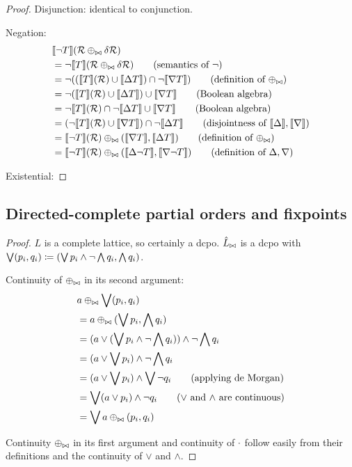 \begin{proof}
  Disjunction: identical to conjunction.
  
  Negation:
  \begin{align*}
    &\sem{\neg T}(\semR \twist \diffR)\\
    &= \neg \sem{T}(\semR \twist \diffR) \tag{semantics of $\neg$}\\
    &= \neg ((\sem{T}(\semR) \cup \upsem{T}) \cap \neg \downsem{T}) \tag{definition of $\twist$}\\
    &= \neg (\sem{T}(\semR) \cup \upsem{T}) \cup \downsem{T} \tag{Boolean algebra}\\
    &= \neg \sem{T}(\semR) \cap \neg \upsem{T} \cup \downsem{T} \tag{Boolean algebra}\\
    &= (\neg \sem{T}(\semR) \cup \downsem{T}) \cap \neg \upsem{T} \tag{disjointness of $\upsem{}, \downsem{}$}\\
    &= \sem{\neg T}(\semR) \twist (\downsem{T}, \upsem{T}) \tag{definition of $\twist$}\\
    &= \sem{\neg T}(\semR) \twist (\upsem{\neg T}, \downsem{\neg T}) \tag{definition of $\updiff{}, \downdiff{}$}
  \end{align*}

  Existential:

\end{proof}

\subsection{Directed-complete partial orders and fixpoints}

\booleanAlgebraContinuous*
\begin{proof}
  \label{prf:booleanAlgebraContinuous}
  $L$ is a complete lattice, so certainly a dcpo. $\hat{L}_{\bowtie}$ is a
  dcpo with $\bigvee (p_i, q_i) \coloneqq (\bigvee p_i \wedge \neg \bigwedge q_i, \bigwedge q_i)$.

  Continuity of $\oplus_{\bowtie}$ in its second argument:
  \begin{align*}
    &a \oplus_{\bowtie} \bigvee (p_i, q_i)\\
    &= a \oplus_{\bowtie} (\bigvee p_i, \bigwedge q_i)\\
    &= (a \vee (\bigvee p_i \wedge \neg \bigwedge q_i)) \wedge \neg \bigwedge q_i\\
    &= (a \vee \bigvee p_i) \wedge \neg \bigwedge q_i\\
    &= (a \vee \bigvee p_i) \wedge \bigvee \neg q_i \tag{applying de Morgan}\\
    &= \bigvee (a \vee p_i) \wedge \neg q_i \tag{$\vee$ and $\wedge$ are continuous}\\
    &= \bigvee a \oplus_{\bowtie} (p_i, q_i)
  \end{align*}

  Continuity $\oplus_{\bowtie}$ in its first argument and continuity of $\cdot$ follow easily from their definitions and the continuity
  of $\vee$ and $\wedge$.
\end{proof}

